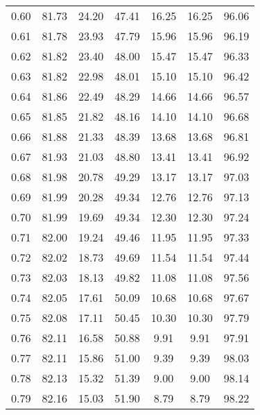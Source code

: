\begin{tabular}{|c|c|c|c|c|c|c|}
      0.60 &     81.73 &     24.20 &      47.41 &   16.25 &      16.25 &         96.06 \\
      0.61 &     81.78 &     23.93 &      47.79 &   15.96 &      15.96 &         96.19 \\
      0.62 &     81.82 &     23.40 &      48.00 &   15.47 &      15.47 &         96.33 \\
      0.63 &     81.82 &     22.98 &      48.01 &   15.10 &      15.10 &         96.42 \\
      0.64 &     81.86 &     22.49 &      48.29 &   14.66 &      14.66 &         96.57 \\
      0.65 &     81.85 &     21.82 &      48.16 &   14.10 &      14.10 &         96.68 \\
      0.66 &     81.88 &     21.33 &      48.39 &   13.68 &      13.68 &         96.81 \\
      0.67 &     81.93 &     21.03 &      48.80 &   13.41 &      13.41 &         96.92 \\
      0.68 &     81.98 &     20.78 &      49.29 &   13.17 &      13.17 &         97.03 \\
      0.69 &     81.99 &     20.28 &      49.34 &   12.76 &      12.76 &         97.13 \\
      0.70 &     81.99 &     19.69 &      49.34 &   12.30 &      12.30 &         97.24 \\
      0.71 &     82.00 &     19.24 &      49.46 &   11.95 &      11.95 &         97.33 \\
      0.72 &     82.02 &     18.73 &      49.69 &   11.54 &      11.54 &         97.44 \\
      0.73 &     82.03 &     18.13 &      49.82 &   11.08 &      11.08 &         97.56 \\
      0.74 &     82.05 &     17.61 &      50.09 &   10.68 &      10.68 &         97.67 \\
      0.75 &     82.08 &     17.11 &      50.45 &   10.30 &      10.30 &         97.79 \\
      0.76 &     82.11 &     16.58 &      50.88 &    9.91 &       9.91 &         97.91 \\
      0.77 &     82.11 &     15.86 &      51.00 &    9.39 &       9.39 &         98.03 \\
      0.78 &     82.13 &     15.32 &      51.39 &    9.00 &       9.00 &         98.14 \\
      0.79 &     82.16 &     15.03 &      51.90 &    8.79 &       8.79 &         98.22 \\

\end{tabular}
